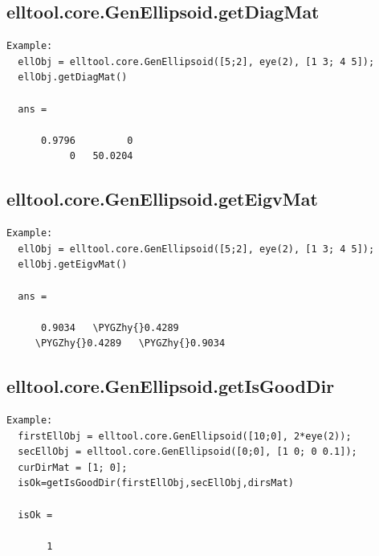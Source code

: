 \documentclass[letterpaper,10pt,english]{sphinxmanual}
\def\PYGZhy{\char`\-}
\begin{document}
\subsection{elltool.core.GenEllipsoid.getDiagMat}
\label{chap_functions:elltool-core-genellipsoid-getdiagmat}
\begin{Verbatim}[commandchars=\\\{\}]
Example:
  ellObj = elltool.core.GenEllipsoid([5;2], eye(2), [1 3; 4 5]);
  ellObj.getDiagMat()

  ans =

      0.9796         0
           0   50.0204
\end{Verbatim}


\subsection{elltool.core.GenEllipsoid.getEigvMat}
\label{chap_functions:elltool-core-genellipsoid-geteigvmat}
\begin{Verbatim}[commandchars=\\\{\}]
Example:
  ellObj = elltool.core.GenEllipsoid([5;2], eye(2), [1 3; 4 5]);
  ellObj.getEigvMat()

  ans =

      0.9034   \PYGZhy{}0.4289
     \PYGZhy{}0.4289   \PYGZhy{}0.9034
\end{Verbatim}


\subsection{elltool.core.GenEllipsoid.getIsGoodDir}
\label{chap_functions:elltool-core-genellipsoid-getisgooddir}
\begin{Verbatim}[commandchars=\\\{\}]
Example:
  firstEllObj = elltool.core.GenEllipsoid([10;0], 2*eye(2));
  secEllObj = elltool.core.GenEllipsoid([0;0], [1 0; 0 0.1]);
  curDirMat = [1; 0];
  isOk=getIsGoodDir(firstEllObj,secEllObj,dirsMat)

  isOk =

       1
\end{Verbatim}
\end{document}
